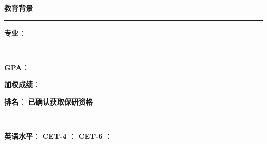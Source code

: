 \documentclass[10pt, a4paper, oneside]{ctexart}
\begin{document}
\ifdefined\educationBackground
\begin{minipage}{1\textwidth}
    \large{\textbf{教育背景}}
\end{minipage}
\rule{\linewidth}{\lineSize}
\begin{center}
    \begin{minipage}{0.9\textwidth}
        \begin{minipage}{0.6\linewidth}
            \university
            \hspace{2em}
            \textbf{\level}
            \hfil
        \end{minipage}
        \begin{minipage}{0.3\linewidth}
            \raggedright
            \textbf{专业}： \major
            \hfil
        \end{minipage} \\
        \begin{minipage}{0.2\linewidth}
            \textbf{GPA}： \gpa \hfil
        \end{minipage}
        \begin{minipage}{0.2\linewidth}
            \textbf{加权成绩}： \grade \hfil
        \end{minipage}
        \begin{minipage}{0.5\linewidth}
            \raggedright
            \textbf{排名}： \rank \ifdefined\qualified \hspace{2em} \textbf{已确认获取保研资格} \fi  \hfil
        \end{minipage} \\
        \ifdefined\showEngLevel
        \begin{minipage}{0.5\linewidth}
            \textbf{英语水平}：
            \hspace{1em}
            \ifdefined\showCETiv
            \textbf{CET-4} \ifdefined\cetIV ： \cetIV \fi \hspace{2em}
            \fi
            \ifdefined\showCETvi
            \textbf{CET-6} \ifdefined\cetVI ： \cetVI \fi \hfil
            \fi
        \end{minipage} \\[0.8em]
        \fi


\end{minipage}
\end{center}
\end{document}
